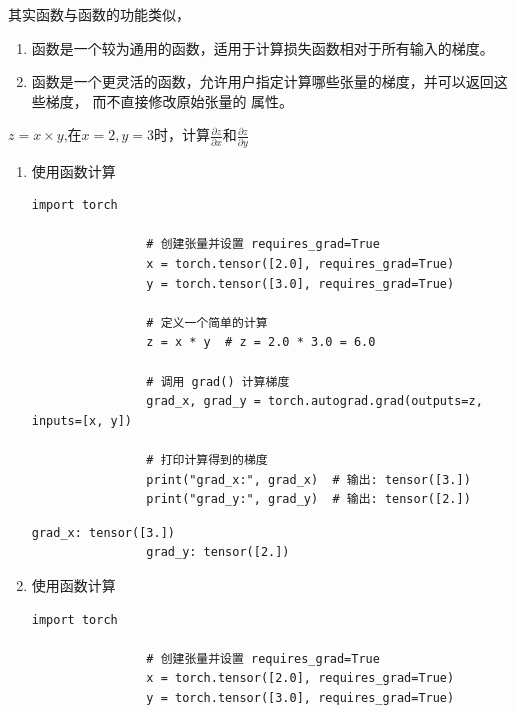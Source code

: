 其实函数与函数的功能类似，
\begin{enumerate}[label=\arabic*)]
        \item {}函数是一个较为通用的函数，适用于计算损失函数相对于所有输入的梯度。
        \item {}函数是一个更灵活的函数，允许用户指定计算哪些张量的梯度，并可以返回这些梯度，
        而不直接修改原始张量的  属性。
\end{enumerate}

\begin{example}
        \exProblem
        $z = x \times y$,在$x=2, y=3$时，计算$\frac{\partial z}{\partial x}$和$\frac{\partial z}{\partial y}$
        \exSolution
        \begin{enumerate}[label=\arabic*)]
                \item 使用函数计算
                \begin{lstlisting}[style=pythonstyle]
                import torch
        
                # 创建张量并设置 requires_grad=True
                x = torch.tensor([2.0], requires_grad=True)
                y = torch.tensor([3.0], requires_grad=True)
        
                # 定义一个简单的计算
                z = x * y  # z = 2.0 * 3.0 = 6.0
        
                # 调用 grad() 计算梯度
                grad_x, grad_y = torch.autograd.grad(outputs=z, inputs=[x, y])
        
                # 打印计算得到的梯度
                print("grad_x:", grad_x)  # 输出: tensor([3.])
                print("grad_y:", grad_y)  # 输出: tensor([2.])
                \end{lstlisting}
                \begin{lstlisting}[style=demostyle, numbers=none]
                grad_x: tensor([3.])
                grad_y: tensor([2.])
                \end{lstlisting}

                \item 使用函数计算
                \begin{lstlisting}[style=pythonstyle]
                import torch

                # 创建张量并设置 requires_grad=True
                x = torch.tensor([2.0], requires_grad=True)
                y = torch.tensor([3.0], requires_grad=True)
                

\end{lstlisting}
\end{enumerate}
\end{example}
